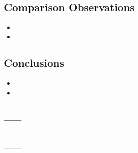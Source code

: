 \documentclass[11pt]{article}
\begin{document}
    \begin{center}
    \end{center}
    { \hspace*{\fill} \\}
    
    \hypertarget{comparison-observations}{%
\subsection{\texorpdfstring{\textbf{Comparison
Observations}}{Comparison Observations}}\label{comparison-observations}}

\begin{itemize}
\item
\item
\end{itemize}

\hypertarget{conclusions}{%
\subsection{\texorpdfstring{\textbf{Conclusions}}{Conclusions}}\label{conclusions}}

\begin{itemize}
\item
\item
\end{itemize}

    \hypertarget{section}{%
\subsection{-----}\label{section}}

\hypertarget{section-1}{%
\subsection{-----}\label{section-1}}


    
    
    
    
\end{document}
